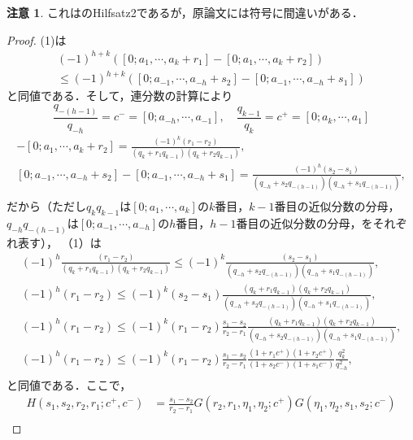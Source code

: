 \documentclass[10pt,a4paper]{ujarticle}
\theoremstyle{definition}
\newtheorem{remark}{注意}
\begin{document}
\begin{remark}
  これは\cite{schecker}のHilfsatz2であるが，原論文には符号に間違いがある．
\end{remark}
\begin{proof}
  (1)は
  \begin{align*}
    (-1)^{h + k} ([0; a_1,\cdots , a_k + r_1] - [0; a_1,\cdots , a_k + r_2]) \\
    \le (-1)^{h + k} ([0; a_{-1}, \cdots, a_{-h} + s_2] - [0; a_{-1}, \cdots, a_{-h} + s_1])
  \end{align*}
  と同値である．そして，連分数の計算により
  \[
  \frac{q_{-(h -1)}}{q_{-h}} = c^- = [0; a_{-h},\cdots, a_{-1}], \quad \frac{q_{k-1}}{q_k} = c^+ = [0;a_k,\cdots, a_1]
  \]
  \begin{align*}
    [0; a_1,\cdots , a_k + r_1] - [0; a_1,\cdots , a_k + r_2] = \frac{(-1)^k (r_1 - r_2)}{(q_k + r_1 q_{k - 1})(q_{k} + r_2 q_{k - 1})}, \\
    [0; a_{-1},\cdots , a_{-h} + s_2] - [0; a_{-1},\cdots , a_{-h} + s_1] = \frac{(-1)^h (s_2 - s_1)}{(q_{-h} + s_2 q_{-(h - 1)})(q_{-h} + s_1 q_{-(h - 1)})}, \\
  \end{align*}
  だから（ただし$q_k q_{k-1}$は$[0; a_1,\cdots, a_k]$の$k$番目，$k-1$番目の近似分数の分母，
  $q_{-h} q_{-(h-1)}$は$[0; a_{-1},\cdots, a_{-h}]$の$h$番目，$h-1$番目の近似分数の分母，をそれぞれ表す），
  （1）は
  \begin{align*}
    (-1)^{h} \frac{(r_1 - r_2)}{(q_k + r_1 q_{k - 1})(q_{k} + r_2 q_{k - 1})}
    \le (-1)^{k} \frac{(s_2 - s_1)}{(q_{-h} + s_2 q_{-(h - 1)})(q_{-h} + s_1 q_{-(h - 1)})}, \\
    (-1)^{h} (r_1 - r_2)
    \le (-1)^{k} (s_2 - s_1)\frac{(q_k + r_1 q_{k - 1})(q_{k} + r_2 q_{k - 1})}{(q_{-h} + s_2 q_{-(h - 1)})(q_{-h} + s_1 q_{-(h - 1)})}, \\
    (-1)^{h} (r_1 - r_2)
    \le (-1)^{k} (r_1 - r_2)\frac{s_1 - s_2}{r_2 - r_1}\frac{(q_k + r_1 q_{k - 1})(q_{k} + r_2 q_{k - 1})}{(q_{-h} + s_2 q_{-(h - 1)})(q_{-h} + s_1 q_{-(h - 1)})}, \\
    (-1)^{h} (r_1 - r_2)
    \le (-1)^{k} (r_1 - r_2)\frac{s_1 - s_2}{r_2 - r_1}\frac{(1 + r_1 c^+)(1 + r_2 c^+)}{(1 + s_2 c^-)(1 + s_1 c^-)}\frac{q_k^2}{q_{-h}^2}, \\
  \end{align*}
  と同値である．ここで，
  \begin{align*}
    H(s_1, s_2, r_2, r_1; c^+, c^-) &= \frac{s_1 - s_2}{r_2 - r_1}G(r_2, r_1, \eta_1, \eta_2; c^+)G(\eta_1, \eta_2, s_1, s_2; c^-) \\

\end{align*}
\end{proof}
\end{document}
